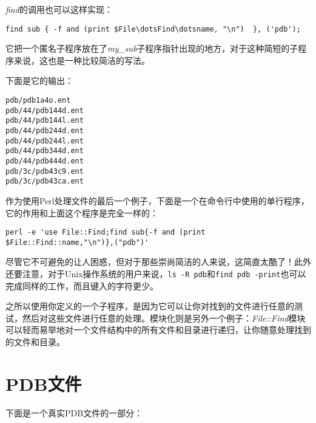 \textit{find}的调用也可以这样实现：

\begin{lstlisting}
find sub { -f and (print $File\dotsFind\dotsname, "\n")  }, ('pdb');
\end{lstlisting}

它把一个匿名子程序放在了\textit{my\_sub}子程序指针出现的地方，对于这种简短的子程序来说，这也是一种比较简洁的写法。

下面是它的输出：

\begin{lstlisting}
pdb/pdb1a4o.ent
pdb/44/pdb144d.ent
pdb/44/pdb144l.ent
pdb/44/pdb244d.ent
pdb/44/pdb244l.ent
pdb/44/pdb344d.ent
pdb/44/pdb444d.ent
pdb/3c/pdb43c9.ent
pdb/3c/pdb43ca.ent
\end{lstlisting}

作为使用Perl处理文件的最后一个例子，下面是一个在命令行中使用的单行程序，它的作用和上面这个程序是完全一样的：

\begin{lstlisting}
perl -e 'use File::Find;find sub{-f and (print $File::Find::name,"\n")},("pdb")'
\end{lstlisting}

尽管它不可避免的让人困惑，但对于那些崇尚简洁的人来说，这简直太酷了！此外还要注意，对于Unix操作系统的用户来说，\verb|ls -R pdb|和\verb|find pdb -print|也可以完成同样的工作，而且键入的字符更少。

之所以使用你定义的一个子程序，是因为它可以让你对找到的文件进行任意的测试，然后对这些文件进行任意的处理。模块化则是另外一个例子：\textit{File::Find}模块可以轻而易举地对一个文件结构中的所有文件和目录进行递归，让你随意处理找到的文件和目录。

\section{PDB文件}
下面是一个真实PDB文件的一部分：

